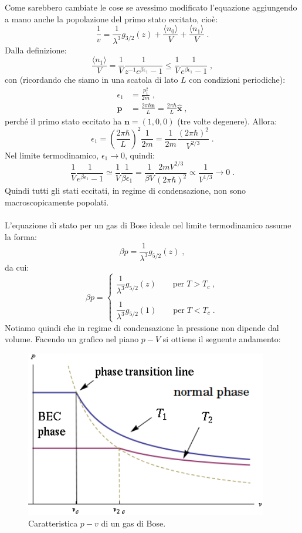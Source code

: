 \documentclass[10pt,a4paper]{report}
\theoremstyle{definition}
\numberwithin{equation}{section}
\newcommand{\bra}{\langle}
\newcommand{\ket}{\rangle}
\begin{document}
Come sarebbero cambiate le cose se avessimo modificato l'equazione aggiungendo a mano anche la popolazione del primo stato eccitato, cioè:
$$
\frac{1}{v}=\frac{1}{\lambda^3}g_{3/2}(z)+\frac{\bra n_0\ket}{V}+\frac{\bra n_1\ket}{V}\;.
$$
Dalla definizione:
$$
\frac{\bra n_1\ket}{V}=\frac{1}{V}\frac{1}{z^{-1}e^{\beta\epsilon_1}-1}\le \frac{1}{V}\frac{1}{e^{\beta\epsilon_1}-1}\;,
$$
con (ricordando che siamo in una scatola di lato $L$ con condizioni periodiche):
\begin{align*}
\epsilon_1 &= \frac{p_1^2}{2m}\;, \\
\mathbf{p}&=\frac{2\pi\hbar\mathbf{n}}{L}=\frac{2\pi\hbar}{L}\hat{\mathbf{x}}\;,
\end{align*}
perché il primo stato eccitato ha $\mathbf{n}=(1,0,0)$ (tre volte degenere). Allora:
$$
\epsilon_1=\left(\frac{2\pi\hbar}{L}\right)^2\frac{1}{2m}=\frac{1}{2m}\frac{(2\pi\hbar)^2}{V^{2/3}}\;.
$$
Nel limite termodinamico, $\epsilon_1\to 0$, quindi:
$$
\frac{1}{V}\frac{1}{e^{\beta\epsilon_1}-1}\simeq \frac{1}{V}\frac{1}{\beta\epsilon_1}=\frac{1}{\beta V}\frac{2mV^{2/3}}{(2\pi\hbar)^2}\propto\frac{1}{V^{1/3}}\to 0\;.
$$
Quindi tutti gli stati eccitati, in regime di condensazione, non sono macroscopicamente popolati. \\
\\
L'equazione di stato per un gas di Bose ideale nel limite termodinamico assume la forma:
\begin{equation*}
\beta p=\frac{1}{\lambda^3}g_{5/2}(z)\;,
\end{equation*}
da cui:
\begin{equation}
\beta p=\begin{cases}
\dfrac{1}{\lambda^3}g_{5/2}(z)\qquad \mbox{per}\; T>T_c\;, \\
\\
\dfrac{1}{\lambda^3}g_{5/2}(1)\qquad \mbox{per}\; T<T_c\;.
\end{cases}
\end{equation}
Notiamo quindi che in regime di condensazione la pressione non dipende dal volume. Facendo un grafico nel piano $p-V$ si ottiene il seguente andamento:

\begin{figure}[h]
\centering
\includegraphics[width=300pt,keepaspectratio=true]{Addons/pressure}
\caption{\footnotesize{Caratteristica $p-v$ di un gas di Bose.}}
\end{figure}
\pagebreak
\end{document}
